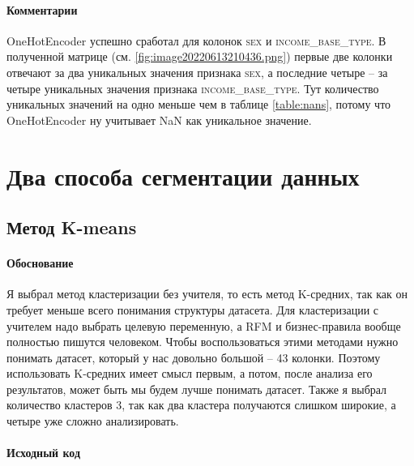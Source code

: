 \documentclass[12pt,a4paper]{article}
\begin{document}
  \paragraph*{Комментарии}
  OneHotEncoder успешно сработал для колонок \textsc{sex} и \textsc{income\_base\_type}.
  В полученной матрице (см. \autoref{fig:image20220613210436.png})
  первые две колонки отвечают за два уникальных значения признака \textsc{sex},
  а последние четыре -- за четыре уникальных значения признака \textsc{income\_base\_type}.
  Тут количество уникальных значений на одно меньше чем в таблице \ref{table:nans},
  потому что OneHotEncoder ну учитывает NaN как уникальное значение.

  \newpage
  \section{Два способа сегментации данных}
  \subsection{Метод K-means}

  \paragraph*{Обоснование}
  Я выбрал метод кластеризации без учителя, то есть метод K-средних, так как он требует меньше всего понимания структуры датасета.
  Для кластеризации с учителем надо выбрать целевую переменную, а RFM и бизнес-правила вообще полностью пишутся человеком.
  Чтобы воспользоваться этими методами нужно понимать датасет, который у нас довольно большой -- 43 колонки.
  Поэтому использовать K-средних имеет смысл первым, а потом, после анализа его результатов, может быть мы будем лучше понимать датасет.
  Также я выбрал количество кластеров 3, так как два кластера получаются слишком широкие, а четыре уже сложно анализировать.

  \paragraph*{Исходный код}
\begin{Shaded}
\begin{Highlighting}[]
\OperatorTok{=}\OperatorTok{=}\OperatorTok{=}
\end{Highlighting}
\end{Shaded}
\end{document}

